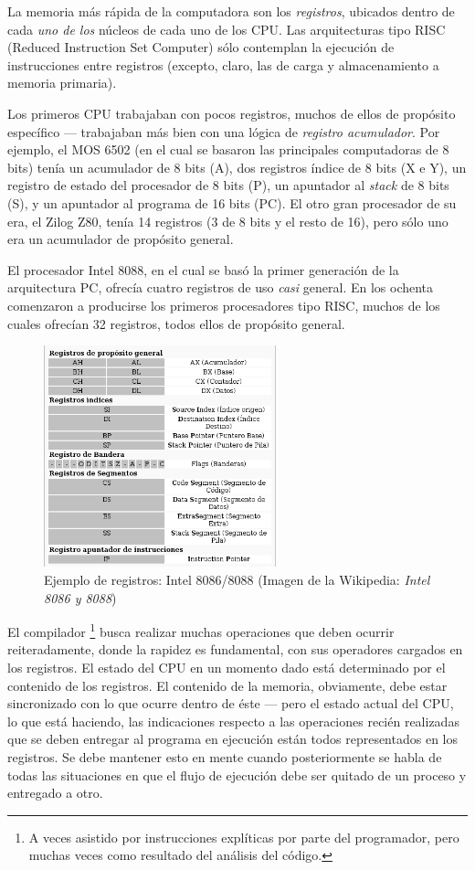 \documentclass[11pt,fleqn]{book} %
\begin{document}
La memoria más rápida de la computadora son los \emph{registros}, ubicados
dentro de cada \emph{uno de los} núcleos de cada uno de los CPU. Las
arquitecturas tipo RISC (Reduced Instruction Set Computer) 
sólo contemplan la ejecución de instrucciones
entre registros (excepto, claro, las de carga y almacenamiento a
memoria primaria).

Los primeros CPU trabajaban con pocos registros, muchos de ellos de
propósito específico — trabajaban más bien con una lógica de \emph{registro acumulador}. Por ejemplo, el MOS 6502 (en el cual se basaron las
principales computadoras de 8 bits) tenía un acumulador de 8 bits (A),
dos registros índice de 8 bits (X e Y), un registro de estado del
procesador de 8 bits (P), un apuntador al \emph{stack} de 8 bits (S), y un
apuntador al programa de 16 bits (PC). El otro gran procesador de su
era, el Zilog Z80, tenía 14 registros (3 de 8 bits y el resto de 16),
pero sólo uno era un acumulador de propósito general.

El procesador Intel 8088, en el cual se basó la primer generación de
la arquitectura PC, ofrecía cuatro registros de uso \emph{casi} general. En
los ochenta comenzaron a producirse los primeros procesadores tipo RISC,
muchos de los cuales ofrecían 32 registros, todos ellos de propósito
general.

\begin{figure}[htb]
\centering
\includegraphics[width=0.6\textwidth]{./img/registros_8086.png}
\caption{\label{HW_registros_8086}Ejemplo de registros: Intel 8086/8088 (Imagen de la Wikipedia: \emph{Intel 8086 y 8088})}
\end{figure}

El compilador \footnote{A veces asistido por instrucciones explíticas por
parte del programador, pero muchas veces como resultado del análisis
del código. } busca realizar muchas operaciones que deben ocurrir
reiteradamente, donde la rapidez es fundamental, con sus operadores
cargados en los registros. El estado del CPU en un momento dado está
determinado por el contenido de los registros. El contenido de la
memoria, obviamente, debe estar sincronizado con lo que ocurre dentro
de éste — pero el estado actual del CPU, lo que está haciendo, las
indicaciones respecto a las operaciones recién realizadas que se deben
entregar al programa en ejecución están todos representados en los
registros. Se debe mantener esto en mente cuando posteriormente se
habla de todas las situaciones en que el flujo de ejecución debe ser
quitado de un proceso y entregado a otro.
\end{document}
